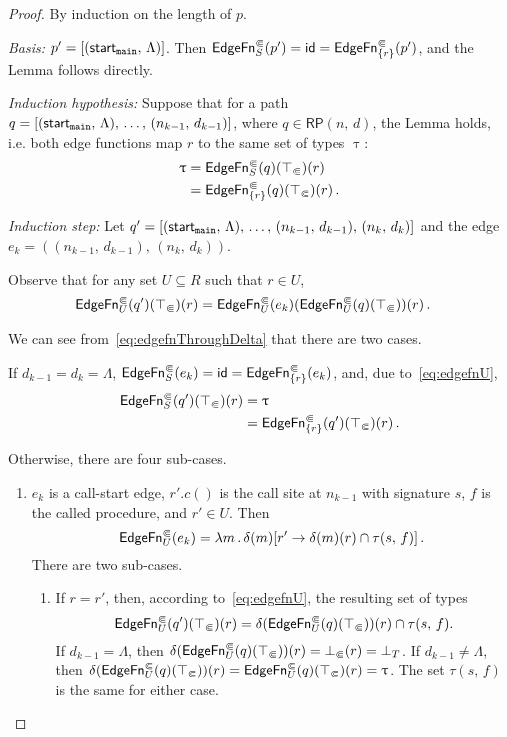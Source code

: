\begin{proof}
  By induction on the length of $p$.
  
  \textit{Basis:} $p'=[(\textsf{start}_\texttt{main},\,\Lambda)]$. Then $\textsf{EdgeFn}^\Subset_{S}(p')=\textsf{id}=\textsf{EdgeFn}^\Subset_{\{r\}}(p')$, and the Lemma follows directly.
  
  \textit{Induction hypothesis:} Suppose that for a path $q=[(\textsf{start}_\texttt{main},\,\Lambda),\,\dots,\,(n_{k-1},\,d_{k-1})]$, where $q\in\textsf{RP}(n,\,d)$, the Lemma holds, i.e. both edge functions map $r$ to the same set of types $\uptau$:
  \begin{align*}
    \uptau
    &=\textsf{EdgeFn}^\Subset_{S}(q)(\top_\Subset)(r)\\
    &=\textsf{EdgeFn}^\Subset_{\{r\}}(q)(\top_\Subset)(r)\,.
  \end{align*}
  
  \textit{Induction step:} Let $q'=[(\textsf{start}_\texttt{main},\,\Lambda),\,\dots,\,(n_{k-1},\,d_{k-1}),\,(n_k,\,d_k)]$ and the edge $e_k=((n_{k-1},\,d_{k-1}),\,(n_k,\,d_k))$.
  
  Observe that for any set $U\subseteq R$ such that $r\in U$,
  \begin{align}\label{eq:edgefnU}
    \textsf{EdgeFn}^\Subset_{U}(q')(\top_\Subset)(r)
    &=\textsf{EdgeFn}^\Subset_{U}(e_k)(\textsf{EdgeFn}^\Subset_{U}(q)(\top_\Subset))(r)\,.
  \end{align}
  
  We can see from~\eqref{eq:edgefnThroughDelta} that there are two cases.  
  
  If $d_{k-1}=d_k=\Lambda$, $\textsf{EdgeFn}^\Subset_{S}(e_k)=\textsf{id}=\textsf{EdgeFn}^\Subset_{\{r\}}(e_k)$, and, due to~\eqref{eq:edgefnU},
  \begin{align*}
    \textsf{EdgeFn}^\Subset_{S}(q')(\top_\Subset)(r)&=\uptau\\
    &=\textsf{EdgeFn}^\Subset_{\{r\}}(q')(\top_\Subset)(r)\,.
  \end{align*}
  
  Otherwise, there are four sub-cases.
  \begin{enumerate}
    \item $e_k$ is a call-start edge, $r'.c()$ is the call site at $n_{k-1}$ with signature $s$, $f$ is the called procedure, and $r'\in U$.
    Then
    \[
      \textsf{EdgeFn}^\Subset_{U}(e_k)=\lambda m\,.\,\delta(m)[r'\to\delta(m)(r)\cap\tau(s,\,f)]\,.
    \]
    There are two sub-cases.
    \begin{enumerate}
      \item\label{item:callstartreceq} If $r=r'$, then, according to~\eqref{eq:edgefnU}, the resulting set of types 
        \[
          \textsf{EdgeFn}^\Subset_{U}(q')(\top_\Subset)(r)=\delta(\textsf{EdgeFn}^\Subset_{U}(q)(\top_\Subset))(r)\cap\tau(s,\,f).
        \]
        If $d_{k-1}=\Lambda$, then $\delta(\textsf{EdgeFn}^\Subset_{U}(q)(\top_\Subset))(r)=\bot_\Subset(r)=\bot_T$. If $d_{k-1}\ne\Lambda$, then $\delta(\textsf{EdgeFn}^\Subset_{U}(q)(\top_\Subset))(r)=\textsf{EdgeFn}^\Subset_{U}(q)(\top_\Subset)(r)=\uptau$. The set $\tau(s,\,f)$ is the same for either case.
    

\end{enumerate}
\end{enumerate}
\end{proof}
